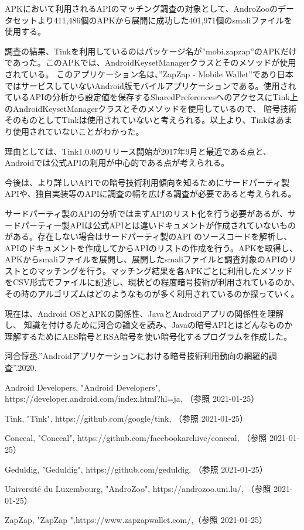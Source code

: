 \documentclass[twocolumn, 10pt, a4paper]{jarticle}
\begin{document}
APKにおいて利用されるAPIのマッチング調査の対象として、AndroZoo\cite{AndroZoo}のデータセットより411,486個のAPKから展開に成功した401,971個のsmaliファイルを使用する。

調査の結果、Tinkを利用しているのはパッケージ名が''mobi.zapzap''のAPKだけであった。このAPKでは、AndroidKeysetManagerクラスとそのメソッドが使用されている。
このアプリケーション名は、''ZapZap - Mobile Wallet''\cite{ZapZap}であり日本ではサービスしていないAndroid版モバイルアプリケーションである。使用されているAPIの分析から設定値を保存するSharedPreferencesへのアクセスにTink上のAndroidKeysetManagerクラスとそのメソッドを使用しているので、
暗号技術そのものとしてTinkは使用されていないと考えられる。以上より、Tinkはあまり使用されていないことがわかった。

理由としては、Tink1.0.0のリリース開始が2017年9月と最近である点と、Androidでは公式APIの利用が中心的である点が考えられる。

今後は、より詳しいAPIでの暗号技術利用傾向を知るためにサードパーティ製APIや、独自実装等のAPIに調査の幅を広げる調査が必要であると考えられる。


サードパーティ製のAPIの分析ではまずAPIのリスト化を行う必要があるが、サードパーティー製APIは公式APIとは違いドキュメントが作成されていないものがある。存在しない場合はサードパーティ製のAPI のソースコードを解析し、APIのドキュメントを作成してからAPIのリストの作成を行う。APKを取得し、APKからsmaliファイルを展開し、展開したsmaliファイルと調査対象のAPIのリストとのマッチングを行う。マッチング結果を各APKごとに利用したメソッドをCSV形式でファイルに記述し、現状どの程度暗号技術が利用されているのか、その時のアルゴリズムはどのようなものが多く利用されているのか探っていく。

現在は、Android OSとAPKの関係性、JavaとAndroidアプリの関係性を理解し、 知識を付けるために河合の論文を読み、Javaの暗号APIとはどんなものか理解するためにAES暗号とRSA暗号を使い暗号化するプログラムを作成した。
\fi


\begin{thebibliography}{10}

河合惇丞.''Androidアプリケーションにおける暗号技術利用動向の網羅的調査''.2020.

Android Developers, "Android Developers", https://developer.android.com/index.html?hl=ja, （参照 2021-01-25）

Tink, "Tink", https://github.com/google/tink, （参照 2021-01-25）

Conceal, "Conceal", https://github.com/facebookarchive/conceal, （参照 2021-01-25）

Geduldig, "Geduldig", https://github.com/geduldig, （参照 2021-01-25）

Université du Luxembourg, "AndroZoo",  https://androzoo.uni.lu/, （参照 2021-01-25）

ZapZap, "ZapZap ",https://www.zapzapwallet.com/,（参照 2021-01-25）
\end{thebibliography}
\end{document}
